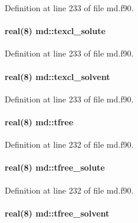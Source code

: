Definition at line 233 of file md.\-f90.

\hypertarget{classmd_a5ce715a3ebe473b75055a02001415d0f}{
\paragraph[{texcl\-\_\-solute}]{\setlength{\rightskip}{0pt plus 5cm}real(8) md\-::texcl\-\_\-solute}}\label{classmd_a5ce715a3ebe473b75055a02001415d0f}


Definition at line 233 of file md.\-f90.

\hypertarget{classmd_a4a0dd664ab2993af3ece7e8f0e3811d7}{
\paragraph[{texcl\-\_\-solvent}]{\setlength{\rightskip}{0pt plus 5cm}real(8) md\-::texcl\-\_\-solvent}}\label{classmd_a4a0dd664ab2993af3ece7e8f0e3811d7}


Definition at line 233 of file md.\-f90.

\hypertarget{classmd_ac5ed2788ab9247d69ed64b95b6b44af5}{
\paragraph[{tfree}]{\setlength{\rightskip}{0pt plus 5cm}real(8) md\-::tfree}}\label{classmd_ac5ed2788ab9247d69ed64b95b6b44af5}


Definition at line 232 of file md.\-f90.

\hypertarget{classmd_affb05f7cd49461aeb89ae49a4fa48c1b}{
\paragraph[{tfree\-\_\-solute}]{\setlength{\rightskip}{0pt plus 5cm}real(8) md\-::tfree\-\_\-solute}}\label{classmd_affb05f7cd49461aeb89ae49a4fa48c1b}


Definition at line 232 of file md.\-f90.

\hypertarget{classmd_a80ab4ec7d5eba0069f46705237d2ba0d}{
\paragraph[{tfree\-\_\-solvent}]{\setlength{\rightskip}{0pt plus 5cm}real(8) md\-::tfree\-\_\-solvent}}\label{classmd_a80ab4ec7d5eba0069f46705237d2ba0d}


